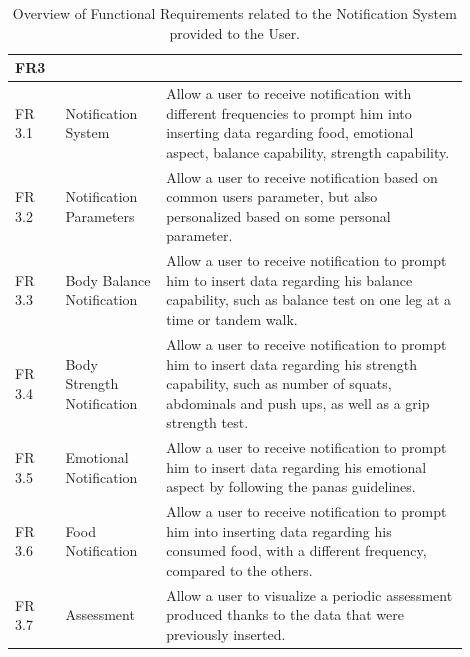 \begin{table}[h!]
    \setstretch{\myspacing}
    \centering
    \begin{tabular}{|>{\raggedright\arraybackslash}p{0.1\linewidth}|>{\raggedright\arraybackslash}p{0.2\linewidth}|>{\raggedright\arraybackslash}p{0.6\linewidth}|}
        \hline
        \textbf{FR3} & \multicolumn{2}{>{\centering\arraybackslash}p{0.7\linewidth}|}{\textbf{Notification System}} \\
        \hline
        FR 3.1 & Notification System & Allow a user to receive notification with different frequencies to prompt him into inserting data regarding food, emotional aspect, balance capability, strength capability. \\
        \hline
        FR 3.2 & Notification Parameters & Allow a user to receive notification based on common users parameter, but also personalized based on some personal parameter. \\
        \hline
        FR 3.3 & Body Balance Notification & Allow a user to receive notification to prompt him to insert data regarding his balance capability, such as balance test on one leg at a time or tandem walk. \\
        \hline
        FR 3.4 & Body Strength Notification & Allow a user to receive notification to prompt him to insert data regarding his strength capability, such as number of squats, abdominals and push ups, as well as a grip strength test. \\
        \hline
        FR 3.5 & Emotional Notification & Allow a user to receive notification to prompt him to insert data regarding his emotional aspect by following the panas guidelines. \\
        \hline
        FR 3.6 & Food Notification & Allow a user to receive notification to prompt him into inserting data regarding his consumed food, with a different frequency, compared to the others. \\
        \hline
        FR 3.7 & Assessment & Allow a user to visualize a periodic assessment produced thanks to the data that were previously inserted. \\
        \hline
    \end{tabular}
    \caption{Overview of Functional Requirements related to the Notification System provided to the User.}
    \label{tab:fr3}
\end{table}

